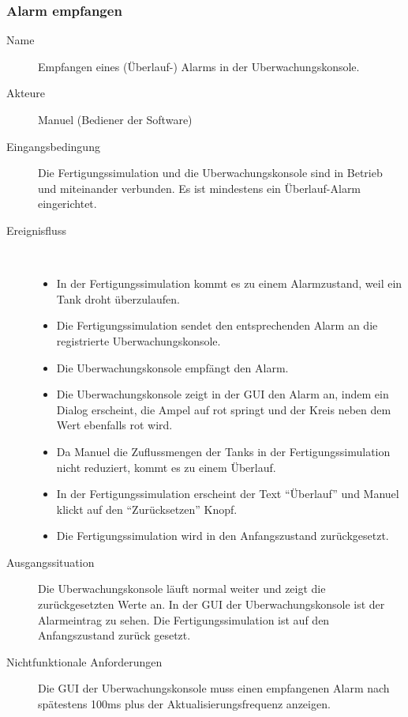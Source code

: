 \documentclass[parskip=full]{scrartcl}
\begin{document}
\subsubsection{Alarm empfangen}
\begin{description}
  \item[Name] Empfangen eines (Überlauf-) Alarms in der \gls{Uberwachungskonsole}.
  \item[Akteure] Manuel (Bediener der Software)
  \item[Eingangsbedingung] Die \gls{Fertigungssimulation} und die \gls{Uberwachungskonsole} sind in Betrieb und miteinander verbunden.
    Es ist mindestens ein Überlauf-Alarm eingerichtet.
  \item[Ereignisfluss]~\\
  \begin{itemize}[noitemsep]
    \item In der \gls{Fertigungssimulation} kommt es zu einem Alarmzustand, weil ein Tank droht überzulaufen.
    \item Die \gls{Fertigungssimulation} sendet den entsprechenden Alarm an die registrierte \gls{Uberwachungskonsole}.
    \item Die \gls{Uberwachungskonsole} empf\"angt den Alarm.
    \item Die \gls{Uberwachungskonsole} zeigt in der \gls{GUI} den Alarm an, indem ein Dialog erscheint, die Ampel auf rot springt und der Kreis neben dem Wert ebenfalls rot wird.
    \item Da Manuel die Zuflussmengen der Tanks in der \gls{Fertigungssimulation} nicht reduziert, kommt es zu einem Überlauf.
    \item In der \gls{Fertigungssimulation} erscheint der Text "`Überlauf"' und Manuel klickt auf den "`Zurücksetzen"' Knopf.
    \item Die Fertigungssimulation wird in den Anfangszustand zurückgesetzt.
  \end{itemize}
  \item[Ausgangssituation] Die \gls{Uberwachungskonsole} läuft normal weiter und zeigt die zurückgesetzten Werte an. In der \gls{GUI} der
    \gls{Uberwachungskonsole} ist der Alarmeintrag zu sehen. Die \gls{Fertigungssimulation} ist auf den Anfangszustand zurück gesetzt.
  \item [Nichtfunktionale Anforderungen] Die \gls{GUI} der \gls{Uberwachungskonsole} muss einen empfangenen Alarm nach sp\"atestens
    100ms plus der Aktualisierungsfrequenz anzeigen.
\end{description}
\end{document}
